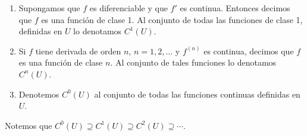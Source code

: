 \begin{definicion}

\begin{enumerate}
    \item Supongamos que $f$ es diferenciable y que $f'$ es continua. Entonces decimos que $f$ es una función de clase 1. Al conjunto de todas las funciones de clase 1, definidas en $U$ lo denotamos $C^1(U)$.
    \item Si $f$ tiene derivada de orden $n$, $n=1,2,\dots $ y $f^{(n)}$ es continua, decimos que $f$ es una función de clase $n$. Al conjunto de tales funciones lo denotamos $C^{n}(U)$.
    \item Denotemos $C^{0}(U)$ al conjunto de todas las funciones continuas definidas en $U$.
\end{enumerate}

\begin{remark}
Notemos que $C^0(U)\supseteq C^1(U)\supseteq C^2(U)\supseteq \cdots .$
\end{remark}
\end{definicion}

